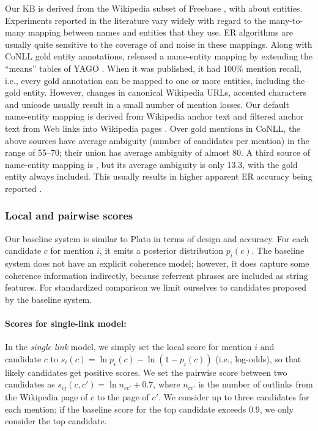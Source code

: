 Our KB is derived from the Wikipedia subset of Freebase , with about  entities.  Experiments reported in
the literature vary widely with regard to the many-to-many mapping
between names and entities that they use.  ER algorithms are usually
quite sensitive to the coverage of and noise in these mappings.  Along
with CoNLL gold entity annotations,  released a
name-entity mapping by extending the ``means'' tables of YAGO
\cite{hoffart2013yago2}.  When it was published, it had 100\% mention
recall, i.e., every gold annotation can be mapped to one or more
entities, including the gold entity.  However, changes in canonical
Wikipedia URLs, accented characters and unicode usually result in a
small number of mention losses.  Our default name-entity mapping is
derived from Wikipedia anchor text and  filtered anchor
text from Web links into Wikipedia pages \cite{singh12:wiki-links}.
Over gold mentions in CoNLL, the above sources have average ambiguity
(number of candidates per mention) in the range of 55--70; their union
has average ambiguity of almost 80.  A third source of name-entity
mapping is , but its average ambiguity is only
13.3, with the gold entity always included.  This usually results in
higher apparent ER accuracy being reported
\cite{Pershina2015,YamadaS0T16}.


\subsubsection{Local and pairwise scores}
\label{sec:expt:features}

Our baseline system is similar to Plato \cite{Lazic2015} in terms of
design and accuracy.  For each candidate $c$ for mention $i$, it emits
a posterior distribution $p_i(c)$.  The baseline system does not have
an explicit coherence model; however, it does capture some coherence
information indirectly, because referrent phrases are included as
string features.  For standardized comparison we limit ourselves to
candidates proposed by the baseline system.

\paragraph*{Scores for single-link model:}
In the \emph{single link} model, we simply set the local score for
mention $i$ and candidate $c$ to $s_i(c) = \ln p_i(c) - \ln (1 -
p_i(c))$ (i.e., log-odds), so that likely candidates get positive
scores.  We set the pairwise score between two candidates as
$s_{ij}(c, c') = \ln n_{cc'} + 0.7$, where $n_{cc'}$ is the number of
outlinks from the Wikipedia page of $c$ to the page of $c'$.  We
consider up to three candidates for each mention; if the baseline
score for the top candidate exceeds $0.9$, we only consider the top
candidate.

